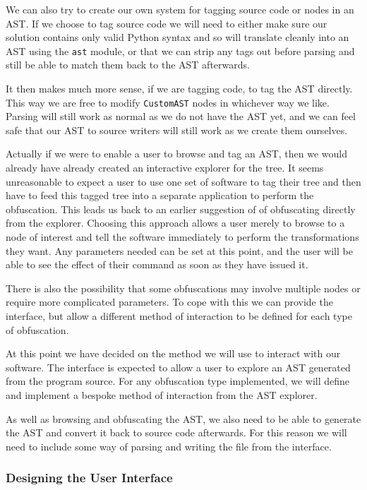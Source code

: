 \documentclass[twoside,a4paper]{report}
\begin{document}
We can also try to create our own system for tagging source code or nodes in an AST. If we choose to tag source code we will need
to either make sure our solution contains only valid Python syntax and so will translate cleanly into an AST using the \texttt{ast}
module, or that we can strip any tags out before parsing and still be able to match them back to the AST afterwards.

It then makes much more sense, if we are tagging code, to tag the AST directly. This way we are free to modify \texttt{CustomAST}
nodes in whichever way we like. Parsing will still work as normal as we do not have the AST yet, and we can feel safe that our AST
to source writers will still work as we create them ourselves.

Actually if we were to enable a user to browse and tag an AST, then we would already have already created an interactive explorer for
the tree. It seems unreasonable to expect a user to use one set of software to tag their tree and then have to feed this tagged
tree into a separate application to perform the obfuscation. This leads us back to an earlier suggestion of of obfuscating directly
from the explorer. Choosing this approach allows a user merely to browse to a node of interest and tell the software immediately to perform the
transformations they want. Any parameters needed can be set at this point, and the user will be able to see the effect of their
command as soon as they have issued it.

There is also the possibility that some obfuscations may involve multiple nodes or require more complicated parameters. To cope with
this we can provide the interface, but allow a different method of interaction to be defined for each type of obfuscation.

At this point we have decided on the method we will use to interact with our software. The interface is expected to allow a user to
explore an AST generated from the program source. For any obfuscation type implemented, we will define and implement a bespoke method
of interaction from the AST explorer.

As well as browsing and obfuscating the AST, we also need to be able to generate the AST and convert it back to source code afterwards.
For this reason we will need to include some way of parsing and writing the file from the interface.

\subsubsection{Designing the User Interface}
\end{document}
